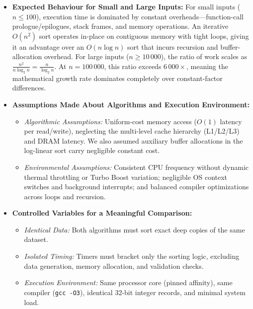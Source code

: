 \documentclass[11pt]{article}
\begin{document}
\begin{itemize}
    \item \textbf{Expected Behaviour for Small and Large Inputs:}
    For small inputs ($n \le 100$), execution time is dominated by constant overheads---function-call prologue/epilogues, stack frames, and memory operations. An iterative $O(n^2)$ sort operates in-place on contiguous memory with tight loops, giving it an advantage over an $O(n \log n)$ sort that incurs recursion and buffer-allocation overhead. For large inputs ($n \ge 10\,000$), the ratio of work scales as $\frac{n^2}{n \log_2 n} = \frac{n}{\log_2 n}$. At $n = 100\,000$, this ratio exceeds $6\,000\times$, meaning the mathematical growth rate dominates completely over constant-factor differences.

    \item \textbf{Assumptions Made About Algorithms and Execution Environment:}
    \begin{itemize}
        \item \textit{Algorithmic Assumptions:} Uniform-cost memory access ($O(1)$ latency per read/write), neglecting the multi-level cache hierarchy (L1/L2/L3) and DRAM latency. We also assumed auxiliary buffer allocations in the log-linear sort carry negligible constant cost.
        \item \textit{Environmental Assumptions:} Consistent CPU frequency without dynamic thermal throttling or Turbo Boost variation; negligible OS context switches and background interrupts; and balanced compiler optimizations across loops and recursion.
    \end{itemize}

    \item \textbf{Controlled Variables for a Meaningful Comparison:}
    \begin{itemize}
        \item \textit{Identical Data:} Both algorithms must sort exact deep copies of the same dataset.
        \item \textit{Isolated Timing:} Timers must bracket only the sorting logic, excluding data generation, memory allocation, and validation checks.
        \item \textit{Execution Environment:} Same processor core (pinned affinity), same compiler (\texttt{gcc -O3}), identical 32-bit integer records, and minimal system load.
    \end{itemize}


\end{itemize}
\end{document}
